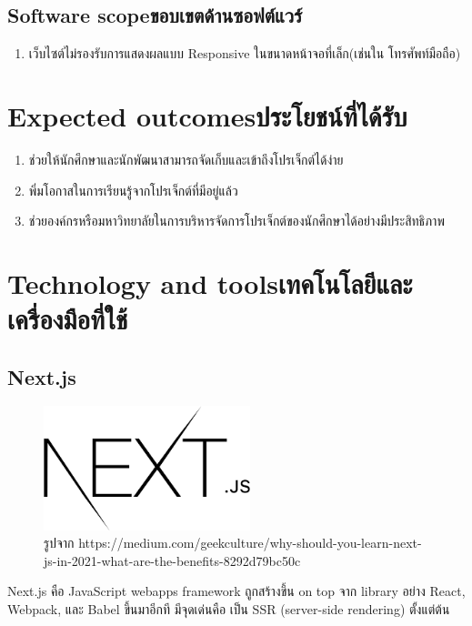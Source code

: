 \subsection{\ifenglish Software scope\else ขอบเขตด้านซอฟต์แวร์\fi}
\begin{enumerate}
  \item เว็บไซต์ไม่รองรับการแสดงผลแบบ Responsive ในขนาดหน้าจอที่เล็ก(เช่นใน โทรศัพท์มือถือ)
\end{enumerate}
\section{\ifenglish Expected outcomes\else ประโยชน์ที่ได้รับ\fi}
\begin{enumerate}
    \item ช่วยให้นักศึกษาและนักพัฒนาสามารถจัดเก็บและเข้าถึงโปรเจ็กต์ได้ง่าย
    \item พิ่มโอกาสในการเรียนรู้จากโปรเจ็กต์ที่มีอยู่แล้ว
    \item ช่วยองค์กรหรือมหาวิทยาลัยในการบริหารจัดการโปรเจ็กต์ของนักศึกษาได้อย่างมีประสิทธิภาพ
\end{enumerate}

\section{\ifenglish Technology and tools\else เทคโนโลยีและเครื่องมือที่ใช้\fi}
\subsection{Next.js}
\begin{figure}[H] %
    \centering
    \includegraphics[width=60mm, keepaspectratio ]{pictures/nextjs.png}
    \caption[Next.js]{รูปจาก https://medium.com/geekculture/why-should-you-learn-next-js-in-2021-what-are-the-benefits-8292d79bc50c}
    \label{fig:nextjs}
\end{figure}
\hspace{1.27cm}Next.js\cite{Nextjs} คือ JavaScript webapps framework ถูกสร้างขึ้น on top จาก library อย่าง React, Webpack, และ Babel ขึ้นมาอีกที มีจุดเด่นคือ เป็น SSR (server-side rendering) ตั้งแต่ต้น
